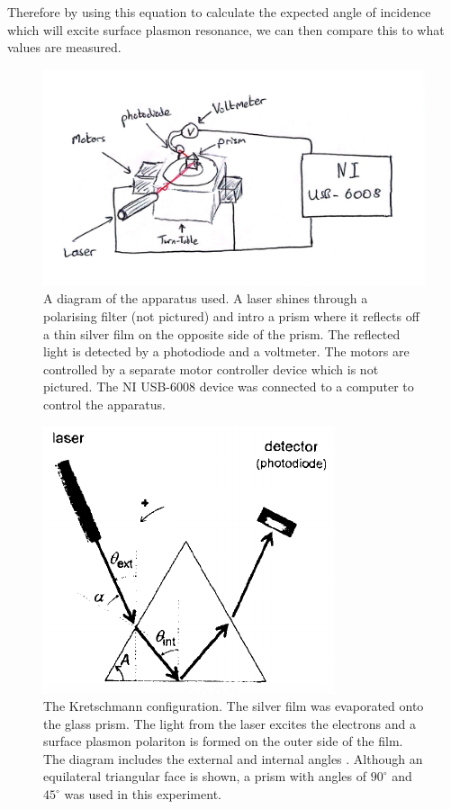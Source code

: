 \documentclass[%
reprint,
amsmath,amssymb,
aps,
]{revtex4-2}
\begin{document}
			Therefore by using this equation to calculate the expected angle of incidence which will excite surface plasmon resonance, we can then compare this to what values are measured.
		
			\begin{figure}
				\includegraphics[width=0.85\columnwidth]{SPdiagram.jpg}
				\caption{\label{fig:apparatus}A diagram of the apparatus used. A laser shines through a polarising filter (not pictured) and intro a prism where it reflects off a thin silver film on the opposite side of the prism. The reflected light is detected by a photodiode and a voltmeter. The motors are controlled by a separate motor controller device which is not pictured. The NI USB-6008 device was connected to a computer to control the apparatus.}
			\end{figure}
			\begin{figure}
				\includegraphics[width=0.7\columnwidth]{anglesDiagram.png}
				\caption{\label{fig:angles}The Kretschmann configuration. The silver film was evaporated onto the glass prism. The light from the laser excites the electrons and a surface plasmon polariton is formed on the outer side of the film. The diagram includes the external and internal angles \cite{pluchery}. Although an equilateral triangular face is shown, a prism with angles of $90^\circ$ and $45^\circ$ was used in this experiment.}
			\end{figure}
	 
\end{document}
